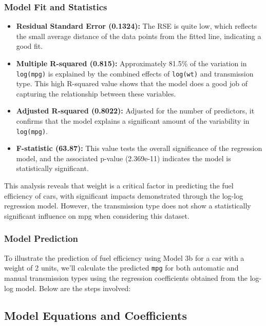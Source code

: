 \documentclass[
  letterpaper,
  DIV=11,
  numbers=noendperiod]{scrreport}
\providecommand{\tightlist}{%
  \setlength{\itemsep}{0pt}\setlength{\parskip}{0pt}}\usepackage{longtable,booktabs,array}
\begin{document}
\subsubsection{Model Fit and Statistics}\label{model-fit-and-statistics}

\begin{itemize}
\tightlist
\item
  \textbf{Residual Standard Error (0.1324):} The RSE is quite low, which
  reflects the small average distance of the data points from the fitted
  line, indicating a good fit.
\item
  \textbf{Multiple R-squared (0.815):} Approximately 81.5\% of the
  variation in \texttt{log(mpg)} is explained by the combined effects of
  \texttt{log(wt)} and transmission type. This high R-squared value
  shows that the model does a good job of capturing the relationship
  between these variables.
\item
  \textbf{Adjusted R-squared (0.8022):} Adjusted for the number of
  predictors, it confirms that the model explains a significant amount
  of the variability in \texttt{log(mpg)}.
\item
  \textbf{F-statistic (63.87):} This value tests the overall
  significance of the regression model, and the associated p-value
  (2.369e-11) indicates the model is statistically significant.
\end{itemize}

This analysis reveals that weight is a critical factor in predicting the
fuel efficiency of cars, with significant impacts demonstrated through
the log-log regression model. However, the transmission type does not
show a statistically significant influence on mpg when considering this
dataset.

\subsubsection{Model Prediction}\label{model-prediction}

To illustrate the prediction of fuel efficiency using Model 3b for a car
with a weight of 2 units, we'll calculate the predicted \texttt{mpg} for
both automatic and manual transmission types using the regression
coefficients obtained from the log-log model. Below are the steps
involved:

\subsection{Model Equations and
Coefficients}\label{model-equations-and-coefficients}
\end{document}
